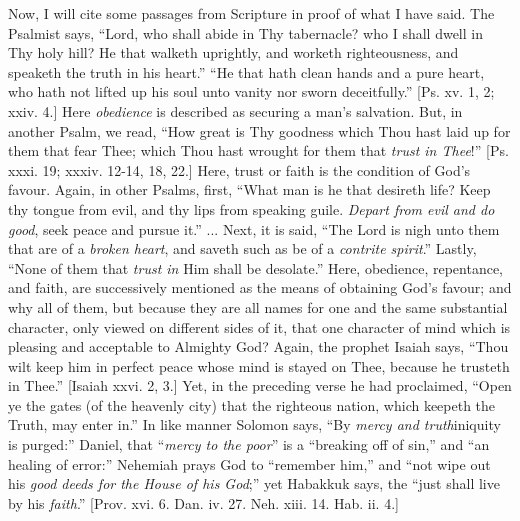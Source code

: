 Now, I will cite some passages from Scripture in proof of what I
have said. The Psalmist says, ``Lord, who shall abide in Thy
tabernacle? who I shall dwell in Thy holy hill? He that walketh
uprightly, and worketh righteousness, and speaketh the truth in his
heart.'' ``He that hath clean hands and a pure heart, who hath
not lifted up his soul unto vanity nor sworn deceitfully.'' [Ps.
xv. 1, 2; xxiv. 4.] Here \emph{obedience} is described as securing a
man's salvation. But, in another Psalm, we read, ``How great is
Thy goodness which Thou hast laid up for them that fear Thee; which
Thou hast wrought for them that \emph{trust in Thee}!'' [Ps. xxxi. 19;
xxxiv. 12-14, 18, 22.] Here,
trust or faith is the condition of God's favour. Again, in other
Psalms, first, ``What man is he that desireth life? Keep thy
tongue from evil, and thy lips from speaking guile. \emph{Depart from
evil and do good}, seek peace and pursue it.'' ... Next, it is
said, ``The Lord is nigh unto them that are of a \emph{broken heart},
and saveth such as be of a \emph{contrite spirit}.'' Lastly,
``None of them that \emph{trust in} Him shall be desolate.'' Here, obedience, repentance, and
faith, are successively mentioned as the means of obtaining God's
favour; and why all of them, but because they are all names for one
and the same substantial character, only viewed on different sides of
it, that one character of mind which is pleasing and acceptable to
Almighty God? Again, the prophet Isaiah says, ``Thou wilt keep him
in perfect peace whose mind is stayed on Thee, because he trusteth in
Thee.'' [Isaiah xxvi. 2, 3.] Yet, in the preceding verse he had
proclaimed, ``Open ye the gates (of the heavenly city) that the
righteous nation, which keepeth the Truth, may enter in.'' In like
manner Solomon says, ``By \emph{mercy and truth}iniquity is
purged:'' Daniel, that ``\emph{mercy to the poor}'' is a
``breaking off of sin,'' and ``an healing of error:''
Nehemiah prays God to ``remember him,'' and ``not wipe out
his \emph{good deeds for the House of his God};'' yet Habakkuk
says, the ``just shall live by his \emph{faith}.'' [Prov. xvi.
6. Dan. iv. 27. Neh. xiii. 14. Hab. ii. 4.]

